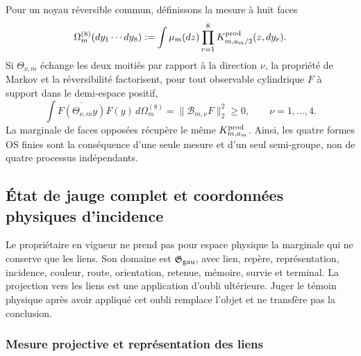 Pour un noyau réversible commun, définissons la mesure à huit faces
\begin{equation}\label{eq:pdf2-ym-ocho-caras}
 \Omega_m^{(8)}(dy_1\cdots dy_8)
 :=\int\mu_m(dz)\prod_{r=1}^{8}K^{\rm prod}_{m,a_m/2}(z,dy_r).
\end{equation}
Si $\Theta_{\nu,m}$ échange les deux moitiés par rapport à la direction $\nu$, la propriété de Markov et la réversibilité factorisent, pour tout observable cylindrique $F$ à support dans le demi-espace positif,
\begin{equation}\label{eq:pdf2-ym-os-finita}
 \int\overline{F(\Theta_{\nu,m}y)}F(y)\,d\Omega_m^{(8)}
 =\|\mathcal B_{m,\nu}F\|_2^2\ge0,
 \qquad \nu=1,\ldots,4.
\end{equation}
La marginale de faces opposées récupère le même
$K^{\rm prod}_{m,a_m}$. Ainsi, les quatre formes OS finies sont
la conséquence d’une seule mesure et d’un seul semi-groupe, non de quatre processus
indépendants.

\subsection{État de jauge complet et coordonnées physiques d’incidence}

Le propriétaire en vigueur ne prend pas pour espace physique la marginale qui ne conserve que
les liens. Son domaine est $\mathfrak G_{\rm gau}$, avec lien, repère,
représentation, incidence, couleur, route, orientation,
retenue, mémoire, survie et terminal. La projection vers les liens est une application
d’oubli ultérieure. Juger le témoin physique après avoir appliqué cet oubli remplace
l’objet et ne transfère pas la conclusion.

\subsubsection{Mesure projective et représentation des liens}

